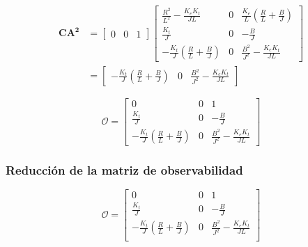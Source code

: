 \begin{equation*}
  \begin{aligned}
    \mathbf{CA^2} &=
    \begin{bmatrix}
      0 & 0 & 1
    \end{bmatrix}
    \begin{bmatrix}
       \tfrac{R^2}{L^2} - \tfrac{K_e K_t}{J L}  & 0 &  \tfrac{K_e}{L}\left( \tfrac{R}{L} + \tfrac{B}{J} \right) \\[4pt]
       \tfrac{K_t}{J}                           & 0 & -\tfrac{B}{J}                                             \\[4pt]
       -\tfrac{K_t}{J}\left( \tfrac{R}{L} + \tfrac{B}{J} \right) & 0 & \tfrac{B^2}{J^2} - \tfrac{K_e K_t}{J L}
    \end{bmatrix} \\
     &=
    \begin{bmatrix}
       -\tfrac{K_t}{J}\left( \tfrac{R}{L} + \tfrac{B}{J} \right) & 0 & \tfrac{B^2}{J^2} - \tfrac{K_e K_t}{J L}
    \end{bmatrix}
  \end{aligned}
\end{equation*}

\begin{equation}
  \mathcal{O} = 
  \begin{bmatrix}
    0 & 0 & 1 \\[4pt]
    \tfrac{K_t}{J} & 0 & -\tfrac{B}{J} \\[4pt]
    -\tfrac{K_t}{J}\left( \tfrac{R}{L} + \tfrac{B}{J} \right) & 0 & \tfrac{B^2}{J^2} - \tfrac{K_e K_t}{J L}
  \end{bmatrix}
  \label{eq:MatrizObservabilidadMotor}
\end{equation}

\subsubsection{Reducción de la matriz de observabilidad}

\begin{equation*}
  \mathcal{O} = 
    \begin{bmatrix}
    0                    & 0 & 1 \\
    \tfrac{K_t}{J}       & 0 & -\tfrac{B}{J} \\
    -\tfrac{K_t}{J}\left( \tfrac{R}{L} + \tfrac{B}{J} \right) & 0 & \tfrac{B^2}{J^2} - \tfrac{K_e K_t}{JL} \\
    \end{bmatrix}
\end{equation*}


